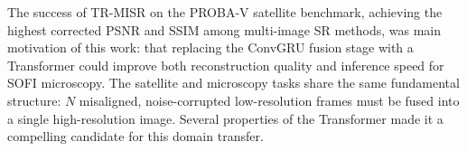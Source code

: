 The success of TR-MISR\cite{TR-MISR-original} on the PROBA-V satellite benchmark, achieving the highest corrected PSNR and SSIM 
among multi-image SR methods, was main motivation of this work: that replacing the ConvGRU fusion stage with a Transformer could 
improve both reconstruction quality and inference speed for SOFI microscopy. 
The satellite and microscopy tasks share the same fundamental structure: $N$ misaligned, 
noise-corrupted low-resolution frames must be fused into a single high-resolution image. 
Several properties of the Transformer made it a compelling candidate for this domain transfer.
